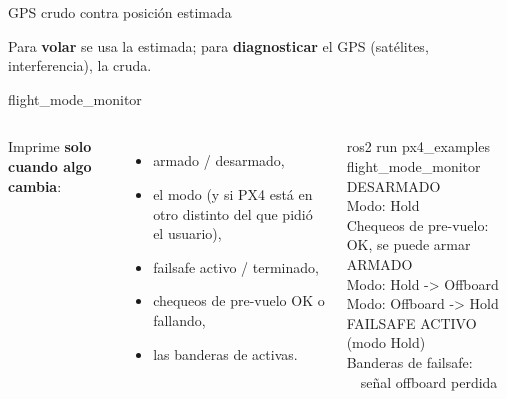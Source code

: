 \begin{frame}{GPS crudo contra posición estimada}
  \centering
  \vspace{0.6em}

  \raggedright\small Para \textbf{volar} se usa la estimada; para \textbf{diagnosticar} el GPS (satélites,
  interferencia), la cruda.
\end{frame}

\begin{frame}{flight\_mode\_monitor}
  \begin{columns}[c]
    \small
    Imprime \textbf{solo cuando algo cambia}:
    \begin{itemize}
      \item armado / desarmado,
      \item el modo (y si PX4 está en otro distinto del que pidió el usuario),
      \item failsafe activo / terminado,
      \item chequeos de pre-vuelo OK o fallando,
      \item las banderas de  activas.
    \end{itemize}
    \begin{terminal}{ros2 run px4\_examples flight\_mode\_monitor}
DESARMADO\\
Modo: Hold\\
Chequeos de pre-vuelo: OK, se puede armar\\
ARMADO\\
Modo: Hold -> Offboard\\
Modo: Offboard -> Hold\\
FAILSAFE ACTIVO (modo Hold)\\
Banderas de failsafe:\\
\ \ señal offboard perdida
    \end{terminal}
  \end{columns}
\end{frame}

